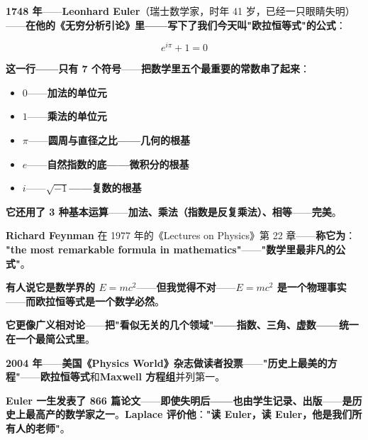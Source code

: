 \begin{tcolorbox}[storybox={\Large 小故事：Euler 与最美的公式}]
\textbf{1748 年}——\textbf{Leonhard Euler}（瑞士数学家，时年 41 岁，已经一只眼睛失明）——\textbf{在他的《无穷分析引论》里——写下了我们今天叫"欧拉恒等式"的公式}：

\[
e^{i\pi} + 1 = 0
\]

\medskip

\textbf{这一行——只有 7 个符号}——\textbf{把数学里五个最重要的常数串了起来}：

\begin{itemize}
\item \textbf{$0$}——\textbf{加法的单位元}
\item \textbf{$1$}——\textbf{乘法的单位元}
\item \textbf{$\pi$}——\textbf{圆周与直径之比——几何的根基}
\item \textbf{$e$}——\textbf{自然指数的底——微积分的根基}
\item \textbf{$i$}——\textbf{$\sqrt{-1}$——复数的根基}
\end{itemize}

\medskip

\textbf{它还用了 3 种基本运算}——\textbf{加法、乘法（指数是反复乘法）、相等}——\textbf{完美}。

\medskip

\textbf{Richard Feynman} 在 1977 年的《Lectures on Physics》第 22 章——\textbf{称它为}：\\
\textbf{"the most remarkable formula in mathematics"}——\textbf{"数学里最非凡的公式"}。

\medskip

\textbf{有人说它是数学界的 $E = mc^2$}——\textbf{但我觉得不对}——\textbf{$E = mc^2$ 是一个物理事实}——\textbf{而欧拉恒等式是一个\textbf{数学必然}}。

\medskip

\textbf{它更像\textbf{广义相对论}}——\textbf{把"看似无关的几个领域"——指数、三角、虚数——\textbf{统一在一个最简公式里}}。

\medskip

\textbf{2004 年}——\textbf{美国《Physics World》杂志做读者投票}——\textbf{"历史上最美的方程"}——\textbf{欧拉恒等式}和\textbf{Maxwell 方程组}并列第一。

\medskip

\textbf{Euler 一生发表了 866 篇论文}——\textbf{即使失明后——也由学生记录、出版}——\textbf{是历史上最高产的数学家之一}。\textbf{Laplace 评价他}：\textbf{"读 Euler，读 Euler，他是我们所有人的老师"}。
\end{tcolorbox}

